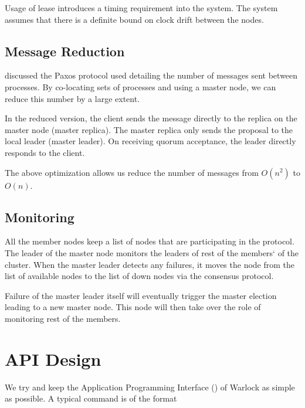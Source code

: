 Usage of lease introduces a timing requirement into the system. The system
assumes that there is a definite bound on clock drift%
between the nodes.

\subsection{Message Reduction}

 discussed the Paxos protocol used detailing the number
of messages sent between processes. By co-locating sets of processes and
using a master node, we can reduce this number by a large extent.

In the reduced version, the client sends the message directly to the
replica on the master node (master replica). The master replica only
sends the proposal to the local leader (master leader). On receiving quorum
acceptance, the leader directly responds to the client.

The above optimization allows us reduce the number of messages from
$O(n^2)$ to $O(n)$.

\subsection{Monitoring}

All the member nodes%
keep a list of nodes that are participating in the protocol.
The leader of the master node monitors the leaders of rest of the members`
of the cluster. When the master leader detects any failures, it moves the
node from the list of available nodes to the list of down nodes via the
consensus protocol.

Failure of the master leader itself will eventually trigger the master election
leading to a new master node. This node will then take over the role of
monitoring rest of the members.

\section{API Design}

We try and keep the Application Programming Interface () of Warlock as
simple as possible. A typical command is of the format

